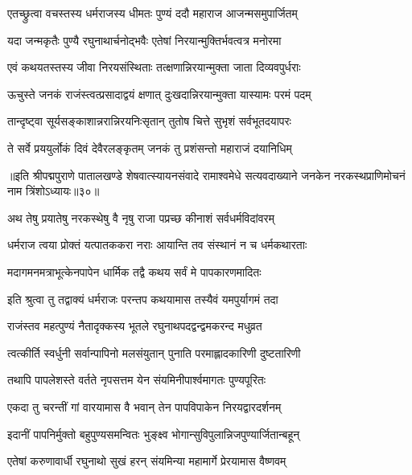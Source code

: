 
\twolineshloka
{एतच्छ्रुत्वा वचस्तस्य धर्मराजस्य धीमतः}
{पुण्यं ददौ महाराज आजन्मसमुपार्जितम्}%

\twolineshloka
{यदा जन्मकृतैः पुण्यै रघुनाथार्चनोद्भवैः}
{एतेषां निरयान्मुक्तिर्भवत्वत्र मनोरमा}%

\twolineshloka
{एवं कथयतस्तस्य जीवा निरयसंस्थिताः}
{तत्क्षणान्निरयान्मुक्ता जाता दिव्यवपुर्धराः}%

\twolineshloka
{ऊचुस्ते जनकं राजंस्त्वत्प्रसादाद्वयं क्षणात्}
{दुःखदान्निरयान्मुक्ता यास्यामः परमं पदम्}%

\twolineshloka
{तान्दृष्ट्वा सूर्यसङ्काशान्नरान्निरयनिःसृतान्}
{तुतोष चित्ते सुभृशं सर्वभूतदयापरः}%

\twolineshloka
{ते सर्वे प्रययुर्लोकं दिवं देवैरलङ्कृतम्}
{जनकं तु प्रशंसन्तो महाराजं दयानिधिम्}%

॥इति श्रीपद्मपुराणे पातालखण्डे शेषवात्स्यायनसंवादे रामाश्वमेधे सत्यवदाख्याने जनकेन नरकस्थप्राणिमोचनं नाम त्रिंशोऽध्यायः॥३०॥



\twolineshloka
{अथ तेषु प्रयातेषु नरकस्थेषु वै नृषु}
{राजा पप्रच्छ कीनाशं सर्वधर्मविदांवरम्}%


\twolineshloka
{धर्मराज त्वया प्रोक्तं यत्पातककरा नराः}
{आयान्ति तव संस्थानं न च धर्मकथारताः}%

\twolineshloka
{मदागमनमत्राभूत्केनपापेन धार्मिक}
{तद्वै कथय सर्वं मे पापकारणमादितः}%

\twolineshloka
{इति श्रुत्वा तु तद्वाक्यं धर्मराजः परन्तप}
{कथयामास तस्यैवं यमपुर्यागमं तदा}%


\twolineshloka
{राजंस्तव महत्पुण्यं नैतादृक्कस्य भूतले}
{रघुनाथपदद्वन्द्वमकरन्द मधुव्रत}%

\twolineshloka
{त्वत्कीर्ति स्वर्धुनी सर्वान्पापिनो मलसंयुतान्}
{पुनाति परमाह्लादकारिणी दुष्टतारिणी}%

\twolineshloka
{तथापि पापलेशस्ते वर्तते नृपसत्तम}
{येन संयमिनीपार्श्वमागतः पुण्यपूरितः}%

\twolineshloka
{एकदा तु चरन्तीं गां वारयामास वै भवान्}
{तेन पापविपाकेन निरयद्वारदर्शनम्}%

\twolineshloka
{इदानीं पापनिर्मुक्तो बहुपुण्यसमन्वितः}
{भुङ्क्ष्व भोगान्सुविपुलान्निजपुण्यार्जितान्बहून्}%

\twolineshloka
{एतेषां करुणावार्धी रघुनाथो सुखं हरन्}
{संयमिन्या महामार्गे प्रेरयामास वैष्णवम्}%

